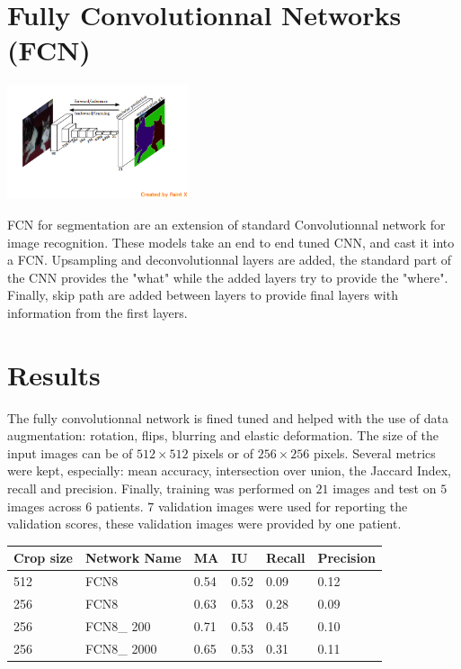 \documentclass[a0,portrait]{a0poster}
\begin{document}
\begin{multicols}{2}
\section*{Fully Convolutionnal Networks (FCN)}
\begin{center}
\includegraphics[trim={0 3cm 0 0},clip,width = 0.4\textwidth]{FCN.png}
\end{center}

FCN for segmentation are an extension of standard
 Convolutionnal network for image recognition. These models
 take an end to end tuned CNN, and cast it into a FCN.
  Upsampling and deconvolutionnal layers are added, the standard
 part of the CNN provides the "what" while the added layers try to provide the "where". 
Finally, skip path are added between layers to provide final layers 
with information from the first layers.

\section*{Results}

The fully convolutionnal network is fined tuned and helped with the use of data augmentation: rotation, flips, blurring and elastic deformation.
The size of the input images can be of $512\times512$ pixels or of 
 $256\times256$ pixels.  Several metrics were kept, especially: mean accuracy, intersection over union, the Jaccard Index, recall and precision.
Finally, training was performed on $21$ images and test on $5$ images across $6$ patients. $7$ validation images were used for reporting the validation scores, these validation images were provided by one patient.
\begin{center}
\begin{tabular}{l l l l l l}
\toprule
\textbf{Crop size} & \textbf{Network Name} & \textbf{MA} & \textbf{IU} & \textbf{Recall} & \textbf{Precision} \\
\midrule
512 & FCN8 & 0.54 & 0.52 & 0.09 & 0.12 \\
256 & FCN8 & 0.63 & 0.53 & 0.28 & 0.09 \\
256 & FCN8\_ 200 & 0.71 & 0.53 & 0.45 & 0.10 \\
256 & FCN8\_ 2000 & 0.65 & 0.53 & 0.31 & 0.11 \\
\bottomrule
\end{tabular}
\end{center}


\end{multicols}
\end{document}
